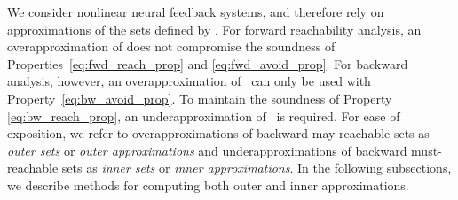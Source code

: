 \documentclass[letterpaper, 10 pt, conference]{ieeeconf}  %
\begin{document}
We consider nonlinear neural feedback systems, and therefore rely on approximations of the sets defined by . For forward reachability analysis, an overapproximation of  does not compromise the soundness of Properties~\eqref{eq:fwd_reach_prop} and \eqref{eq:fwd_avoid_prop}. For backward analysis, however, an overapproximation of~ can only be used with Property~\eqref{eq:bw_avoid_prop}. To maintain the soundness of Property \eqref{eq:bw_reach_prop}, an underapproximation of~ is required. For ease of exposition, we refer to overapproximations of backward may-reachable sets as \emph{outer sets} or \emph{outer approximations} and underapproximations of backward must-reachable sets as \emph{inner sets} or \emph{inner approximations}. In the following subsections, we describe methods for computing both outer and inner approximations.
\end{document}
